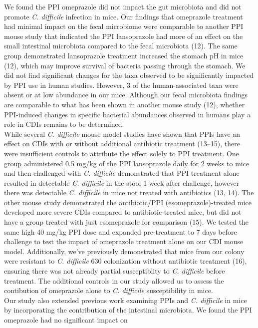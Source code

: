 \documentclass[11pt,]{article}
\begin{document}
We found the PPI omeprazole did not impact the gut microbiota and did
not promote \emph{C. difficile} infection in mice. Our findings that
omeprazole treatment had minimal impact on the fecal microbiome were
comparable to another PPI mouse study that indicated the PPI
lansoprazole had more of an effect on the small intestinal microbiota
compared to the fecal microbiota (12). The same group demonstrated
lansoprazole treatment increased the stomach pH in mice (12), which may
improve survival of bacteria passing through the stomach. We did not
find significant changes for the taxa observed to be significantly
impacted by PPI use in human studies. However, 3 of the human-associated
taxa were absent or at low abundance in our mice. Although our fecal
microbiota findings are comparable to what has been shown in another
mouse study (12), whether PPI-induced changes in specific bacterial
abundances observed in humans play a role in CDIs remains to be
determined.\\
While several \emph{C. difficile} mouse model studies have shown that
PPIs have an effect on CDIs with or without additional antibiotic
treatment (13--15), there were insufficient controls to attribute the
effect solely to PPI treatment. One group administered 0.5 mg/kg of the
PPI lansoprazole daily for 2 weeks to mice and then challenged with
\emph{C. difficile} demonstrated that PPI treatment alone resulted in
detectable \emph{C. difficile} in the stool 1 week after challenge,
however there was detectable \emph{C. difficile} in mice not treated
with antibiotics (13, 14). The other mouse study demonstrated the
antibiotic/PPI (esomeprazole)-treated mice developed more severe CDIs
compared to antibiotic-treated mice, but did not have a group treated
with just esomeprazole for comparison (15). We tested the same high 40
mg/kg PPI dose and expanded pre-treatment to 7 days before challenge to
test the impact of omeprazole treatment alone on our CDI mouse model.
Additionally, we've previously demonstrated that mice from our colony
were resistant to \emph{C. difficile} 630 colonization without
antibiotic treatment (16), ensuring there was not already partial
susceptiblity to \emph{C. difficile} before treatment. The additional
controls in our study allowed us to assess the contibution of omeprazole
alone to \emph{C. difficile} susceptibility in mice.\\
Our study also extended previous work examining PPIs and \emph{C.
difficile} in mice by incorporating the contribution of the intestinal
microbiota. We found the PPI omeprazole had no significant impact on
\end{document}

